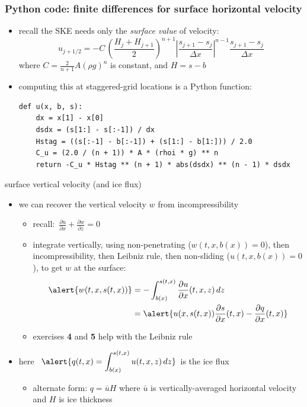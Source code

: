 \documentclass[10pt,dvipsnames]{beamer}
\newcommand{\ds}{\displaystyle}
\begin{document}
\begin{frame}[fragile]
\frametitle{Python code: finite differences for surface horizontal velocity}

\begin{itemize}
\item recall the SKE needs only the \emph{surface value} of velocity:
    $$u_{j+1/2} = - C\, \left(\frac{H_j + H_{j+1}}{2}\right)^{n+1} \left|\frac{s_{j+1}-s_j}{\Delta x}\right|^{n-1} \frac{s_{j+1}-s_j}{\Delta x}$$
where $C = \frac{2}{n+1} A (\rho g)^n$ is constant, and $H=s-b$
\item computing this at staggered-grid locations is a Python function:
\begin{lstlisting}[language=PythonPlus]
def u(x, b, s):
    dx = x[1] - x[0]
    dsdx = (s[1:] - s[:-1]) / dx
    Hstag = ((s[:-1] - b[:-1]) + (s[1:] - b[1:])) / 2.0
    C_u = (2.0 / (n + 1)) * A * (rhoi * g) ** n
    return -C_u * Hstag ** (n + 1) * abs(dsdx) ** (n - 1) * dsdx
\end{lstlisting}
\end{itemize}
\end{frame}


\begin{frame}{surface vertical velocity (and ice flux)}

\begin{itemize}
\item we can recover the vertical velocity $w$ from \alert{incompressibility}

  \begin{itemize}
  \item[$\circ$] recall: \,$\frac{\partial u}{\partial x} + \frac{\partial w}{\partial z} = 0$
  \item[$\circ$] integrate vertically, using non-penetrating ($w(t,x,b(x))=0$), then incompressibility, then Leibniz rule, then non-sliding ($u(t,x,b(x))=0$), to get $w$ at the surface:
\begin{align*}
\alert{w(t,x,s(t,x))} &= - \int_{b(x)}^{s(t,x)} \frac{\partial u}{\partial x}(t,x,z)\,dz \\
     &= \alert{u(x,s(t,x)) \frac{\partial s}{\partial x}(t,x) - \frac{\partial q}{\partial x}(t,x)}
\end{align*}
  \item[$\circ$] exercises \textbf{4} and \textbf{5} help with the Leibniz rule
  \end{itemize}

\medskip
\item here \, $\ds \alert{q(t,x) = \int_{b(x)}^{s(t,x)} u(t,x,z)\,dz}$\, is the \alert{ice flux}
  \begin{itemize}
  \item[$\circ$] alternate form:  $q = \bar u H$ where $\bar u$ is vertically-averaged horizontal velocity and $H$ is ice thickness
  \end{itemize}
\end{itemize}
\end{frame}
\end{document}
